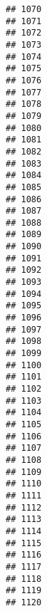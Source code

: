 \documentclass[
]{article}
\begin{document}
\begin{verbatim}
## 1070                                           
## 1071                                           
## 1072                                           
## 1073                                           
## 1074                                           
## 1075                                           
## 1076                                           
## 1077                                           
## 1078                                           
## 1079                                           
## 1080                                           
## 1081                                           
## 1082                                           
## 1083                                           
## 1084                                           
## 1085                                           
## 1086                                           
## 1087                                           
## 1088                                           
## 1089                                           
## 1090                                           
## 1091                                           
## 1092                                           
## 1093                                           
## 1094                                           
## 1095                                           
## 1096                                           
## 1097                                           
## 1098                                           
## 1099                                           
## 1100                                           
## 1101                                           
## 1102                                           
## 1103                                           
## 1104                                           
## 1105                                           
## 1106                                           
## 1107                                           
## 1108                                           
## 1109                                           
## 1110                                           
## 1111                                           
## 1112                                           
## 1113                                           
## 1114                                           
## 1115                                           
## 1116                                           
## 1117                                           
## 1118                                           
## 1119                                           
## 1120                                           

\end{verbatim}
\end{document}
